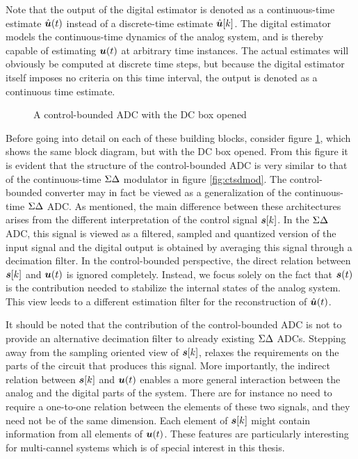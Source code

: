 Note that the output of the digital estimator is denoted as a continuous-time estimate $\hat{\bm{u}}(t)$ instead of a discrete-time estimate $\hat{\bm{u}}[k]$. The digital estimator models the continuous-time dynamics of the analog system, and is thereby capable of estimating $\bm{u}(t)$ at arbitrary time instances. The actual estimates will obviously be computed at discrete time steps, but because the digital estimator itself imposes no criteria on this time interval, the output is denoted as a continuous time estimate.

\begin{figure}[htbp]
    \centering
    
    \caption{A control-bounded ADC with the DC box opened}
    \label{fig:cbadc2}
\end{figure}

Before going into detail on each of these building blocks, consider figure \ref{fig:cbadc2}, which shows the same block diagram, but with the DC box opened. From this figure it is evident that the structure of the control-bounded ADC is very similar to that of the continuous-time $\Sigma\Delta$ modulator in figure \ref{fig:ctsdmod}. The control-bounded converter may in fact be viewed as a generalization of the continuous-time $\Sigma\Delta$ ADC. As mentioned, the main difference between these architectures arises from the different interpretation of the control signal $\bm{s}[k]$. In the $\Sigma\Delta$ ADC, this signal is viewed as a filtered, sampled and quantized version of the input signal and the digital output is obtained by averaging this signal through a decimation filter. In the control-bounded perspective, the direct relation between $\bm{s}[k]$ and $\bm{u}(t)$ is ignored completely. Instead, we focus solely on the fact that $\bm{s}(t)$ is the contribution needed to stabilize the internal states of the analog system. This view leeds to a different estimation filter for the reconstruction of $\hat{\bm{u}}(t)$.

It should be noted that the contribution of the control-bounded ADC is not to provide an alternative decimation filter to already existing $\Sigma\Delta$ ADCs. Stepping away from the sampling oriented view of $\bm{s}[k]$, relaxes the requirements on the parts of the circuit that produces this signal. More importantly, the indirect relation between $\bm{s}[k]$ and $\bm{u}(t)$ enables a more general interaction between the analog and the digital parts of the system. There are for instance no need to require a one-to-one relation between the elements of these two signals, and they need not be of the same dimension. Each element of $\bm{s}[k]$ might contain information from all elements of $\bm{u}(t)$. These features are particularly interesting for multi-cannel systems which is of special interest in this thesis.


















